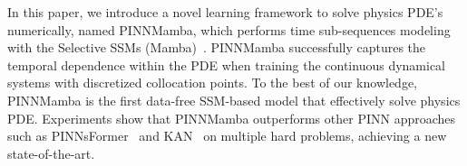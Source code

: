 \documentclass{article}
\theoremstyle{plain}
\theoremstyle{definition}
\theoremstyle{remark}
\begin{document}



In this paper, we introduce a novel learning framework to solve physics PDE's numerically, named PINNMamba, which performs time sub-sequences modeling with the Selective SSMs (Mamba)~\cite{gu2023mamba}. PINNMamba successfully captures the temporal dependence within the PDE when training the continuous dynamical systems with discretized collocation points.
To the best of our knowledge, PINNMamba is the first data-free SSM-based model that effectively solve physics PDE.
Experiments show that PINNMamba outperforms other PINN approaches
such as PINNsFormer~\cite{zhao2024pinnsformer} and KAN~\cite{liu2024kan} on multiple hard problems, achieving a new state-of-the-art.
\end{document}
